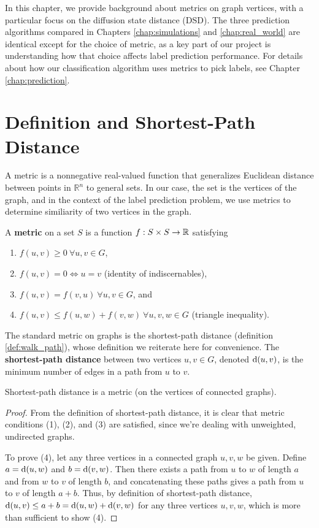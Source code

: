 In this chapter, we provide background about metrics on graph vertices, with a particular focus on
the diffusion state distance (DSD). The three prediction algorithms compared in Chapters
\ref{chap:simulations} and \ref{chap:real_world} are identical except for the choice of metric, as a
key part of our project is understanding how that choice affects label prediction performance. For
details about how our classification algorithm uses metrics to pick labels, see Chapter
\ref{chap:prediction}.


\section{Definition and Shortest-Path Distance}

A metric is a nonnegative real-valued function that generalizes Euclidean distance between points in
$\mathbb{R}^n$ to general sets. In our case, the set is the vertices of the graph, and in the context of the
label prediction problem, we use metrics to determine similiarity of two vertices in the graph.

\begin{definition}
  A \textbf{metric} on a set $S$ is a function $f : S \times S \to \mathbb{R}$
  satisfying

  \begin{enumerate}
  \item $f(u,v)\geq 0 ~ \forall u,v \in G$,
  \item $f(u,v) = 0 \iff u = v$ (identity of indiscernables),
  \item $f(u,v) = f(v,u) ~\forall u,v \in G$, and
  \item $f(u,v) \leq f(u,w) + f(v,w) ~\forall u,v,w \in G$
    (triangle inequality).
  \end{enumerate}
\end{definition}

The standard metric on graphs is the shortest-path distance (definition \ref{def:walk_path}), whose
definition we reiterate here for convenience. The \textbf{shortest-path distance} between two
vertices $u,v \in G$, denoted $\mathrm{d}(u,v)$, is the minimum number of edges in a path from $u$ to $v$.

\begin{proposition}
  Shortest-path distance is a metric (on the vertices of connected graphs).
\end{proposition}

\begin{proof}
  From the definition of shortest-path distance, it is clear that metric conditions (1), (2),
  and (3) are satisfied, since we're dealing with unweighted, undirected graphs.

  To prove (4), let any three vertices in a connected graph $u,v,w$ be given. Define $a=\mathrm{d}(u,w)$
  and $b=\mathrm{d}(v,w)$. Then there exists a path from $u$ to $w$ of length $a$ and from $w$ to $v$ of
  length $b$, and concatenating these paths gives a path from $u$ to $v$ of length $a+b$. Thus, by
  definition of shortest-path distance, $\mathrm{d}(u,v) \leq a + b = \mathrm{d}(u,w) + \mathrm{d}(v,w)$ for any three
  vertices $u,v,w$, which is more than sufficient to show (4).
\end{proof}

